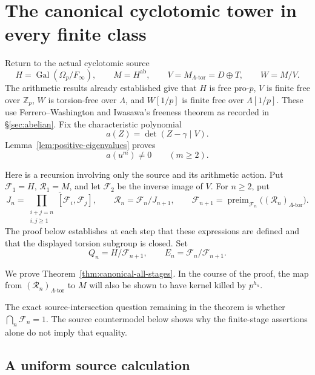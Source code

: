 \section{The canonical cyclotomic tower in every finite class}
\label{sec:canonical-all-stages}

Return to the actual cyclotomic source
\[
 H=\operatorname{Gal}(\Omega_p/F_\infty),\qquad
 M=H^{\mathrm{ab}},\qquad
 V=M_{\Lambda\text{-tor}}=D\oplus T,\qquad W=M/V.
\]
The arithmetic results already established give that \(H\) is free
pro-\(p\), \(V\) is finite free over \(\mathbb Z_p\), \(W\) is
torsion-free over \(\Lambda\), and \(W[1/p]\) is finite free over
\(\Lambda[1/p]\).  These use Ferrero--Washington and Iwasawa's
freeness theorem as recorded in \S\ref{sec:abelian}.
Fix the characteristic polynomial
\[
               a(Z)=\det(Z-\gamma\mid V).
\]
Lemma~\ref{lem:positive-eigenvalues} proves
\begin{equation}\label{eq:uniform-positive-exclusion}
                       a(u^m)\ne0\qquad(m\geq2).
\end{equation}

Here is a recursion involving only the source and its arithmetic
action.  Put \(\mathcal F_1=H\), \(\mathcal R_1=M\), and let \(\mathcal F_2\) be the inverse
image of \(V\).  For \(n\geq2\), put
\begin{equation}\label{eq:uniform-recursion}
 J_n=\overline{\prod_{\substack{i+j=n\\i,j\geq1}}[\mathcal F_i,\mathcal F_j]},
 \qquad
 \mathcal R_n=\mathcal F_n/J_{n+1},
 \qquad
 \mathcal F_{n+1}=\operatorname{preim}_{\mathcal F_n}
                  \bigl((\mathcal R_n)_{\Lambda\text{-tor}}\bigr).
\end{equation}
The proof below establishes at each step that these expressions
are defined and that the displayed torsion subgroup is closed.
Set
\[
 Q_n=H/\mathcal F_{n+1},\qquad E_n=\mathcal F_n/\mathcal F_{n+1}.
\]

We prove Theorem~\ref{thm:canonical-all-stages}. In the course of the proof, the map from \((\mathcal R_n)_{\Lambda\text{-tor}}\) to \(M\) will also be shown to have kernel killed by \(p^{h_n}\).

The exact source-intersection question remaining in the theorem is whether
\(\bigcap_n\mathcal F_n=1\).  The source countermodel below shows why the
finite-stage assertions alone do not imply that equality.

\subsection{A uniform source calculation}


